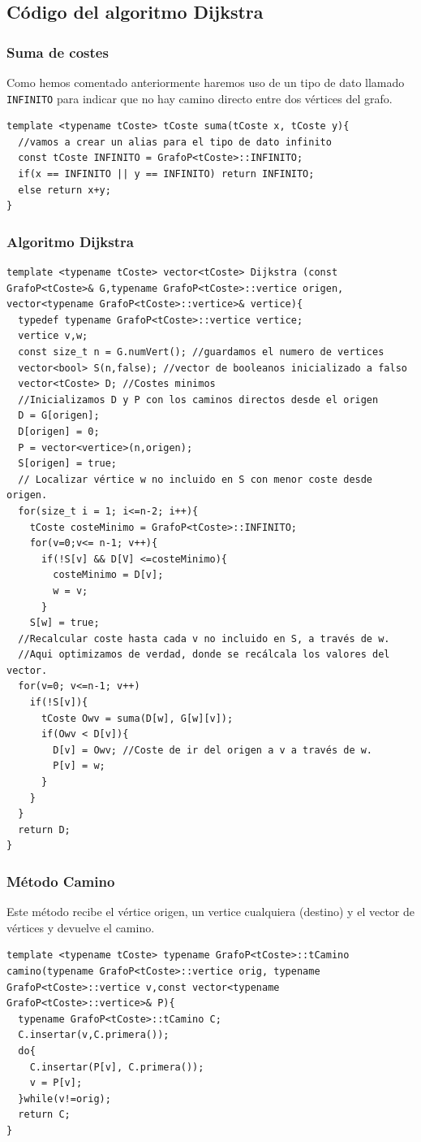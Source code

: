 \subsection{Código del algoritmo Dijkstra}
\subsubsection*{Suma de costes}
Como hemos comentado anteriormente haremos uso de un tipo de dato llamado \texttt{INFINITO} para indicar que no hay camino directo entre dos vértices del grafo.
\begin{verbatim}
template <typename tCoste> tCoste suma(tCoste x, tCoste y){
  //vamos a crear un alias para el tipo de dato infinito
  const tCoste INFINITO = GrafoP<tCoste>::INFINITO;
  if(x == INFINITO || y == INFINITO) return INFINITO;
  else return x+y;
}
\end{verbatim}

\subsubsection*{Algoritmo Dijkstra}
\begin{verbatim}
template <typename tCoste> vector<tCoste> Dijkstra (const GrafoP<tCoste>& G,typename GrafoP<tCoste>::vertice origen, vector<typename GrafoP<tCoste>::vertice>& vertice){
  typedef typename GrafoP<tCoste>::vertice vertice;
  vertice v,w;
  const size_t n = G.numVert(); //guardamos el numero de vertices
  vector<bool> S(n,false); //vector de booleanos inicializado a falso
  vector<tCoste> D; //Costes minimos
  //Inicializamos D y P con los caminos directos desde el origen
  D = G[origen];
  D[origen] = 0;
  P = vector<vertice>(n,origen);
  S[origen] = true;
  // Localizar vértice w no incluido en S con menor coste desde origen.
  for(size_t i = 1; i<=n-2; i++){
    tCoste costeMinimo = GrafoP<tCoste>::INFINITO;
    for(v=0;v<= n-1; v++){
      if(!S[v] && D[V] <=costeMinimo){
        costeMinimo = D[v];
        w = v;
      }
    S[w] = true;
  //Recalcular coste hasta cada v no incluido en S, a través de w.
  //Aqui optimizamos de verdad, donde se recálcala los valores del vector.
  for(v=0; v<=n-1; v++)
    if(!S[v]){
      tCoste Owv = suma(D[w], G[w][v]);
      if(Owv < D[v]){
        D[v] = Owv; //Coste de ir del origen a v a través de w.
        P[v] = w;
      }
    }
  }
  return D;
}
\end{verbatim}
\subsubsection*{Método Camino}
Este método recibe el vértice origen, un vertice cualquiera (destino) y el vector de vértices y devuelve el camino.

\begin{verbatim}
template <typename tCoste> typename GrafoP<tCoste>::tCamino camino(typename GrafoP<tCoste>::vertice orig, typename GrafoP<tCoste>::vertice v,const vector<typename GrafoP<tCoste>::vertice>& P){
  typename GrafoP<tCoste>::tCamino C;
  C.insertar(v,C.primera());
  do{
    C.insertar(P[v], C.primera());
    v = P[v];
  }while(v!=orig);
  return C;
}
\end{verbatim}
